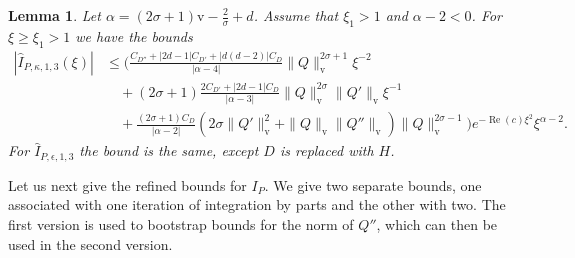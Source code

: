 \documentclass[11pt]{article}
\DeclareMathOperator{\real}{Re}
\newcommand{\normv}{\mathrm{v}}
\newtheorem{lemma}[definition]{Lemma}
\begin{document}
\begin{lemma}\label{lemma:I_P-remainder-bounds-2}
  Let \(\alpha = (2\sigma + 1)\normv - \frac{2}{\sigma} + d\). Assume
  that \(\xi_{1} > 1\) and \(\alpha - 2 < 0\). For
  \(\xi \geq \xi_{1} > 1\) we have the bounds
  \begin{align*}
    |\hat{I}_{P,\kappa,1,3}(\xi)|
    &\leq \Bigg(
      \frac{C_{D''} + |2d - 1|C_{D'} + |d(d - 2)|C_{D}}{|\alpha - 4|}
      \|Q\|_{\normv}^{2\sigma + 1}\xi^{-2}\\
    &\quad + (2\sigma + 1)\frac{2C_{D'} + |2d - 1|C_{D}}{|\alpha - 3|}
      \|Q\|_{\normv}^{2\sigma}\|Q'\|_{\normv}\xi^{-1}\\
    &\quad + \frac{(2\sigma + 1)C_{D}}{|\alpha - 2|}
      (2\sigma\|Q'\|_{\normv}^{2} + \|Q\|_{\normv}\|Q''\|_{\normv})\|Q\|_{\normv}^{2\sigma - 1}
      \Bigg)e^{-\real(c)\xi^{2}}\xi^{\alpha - 2}.
  \end{align*}
  For \(\hat{I}_{P,\epsilon,1,3}\) the bound is the same, except \(D\)
  is replaced with \(H\).
\end{lemma}

Let us next give the refined bounds for \(I_{P}\). We give two
separate bounds, one associated with one iteration of integration by
parts and the other with two. The first version is used to bootstrap
bounds for the norm of \(Q''\), which can then be used in the second
version.
\end{document}
